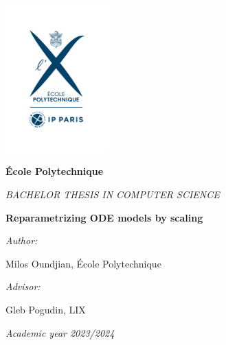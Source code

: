 \documentclass[oneside, a4paper, onecolumn, 11pt]{article}
\newcommand{\thesistitle}[0]{Reparametrizing ODE models by scaling}
\newcommand{\authorname}[0]{Milos Oundjian}
\newcommand{\supervisor}[0]{Gleb Pogudin}
\newcommand{\supervisorinstitution}[0]{LIX}
\begin{document}



\hspace{0pt}
\vfill

\begin{center}

    \includegraphics[width=0.3\textwidth]{logo-EP-vertical}

    \vspace*{2em}
    {\large
        \textbf{\'Ecole Polytechnique}

        \vspace*{1em}
        \textit{BACHELOR THESIS IN COMPUTER SCIENCE}


        \vspace*{3em}
        {\Huge \textbf{\thesistitle}}
        \vspace*{3em}



        \textit{Author:}

        \vspace*{1em}
        \authorname{}, \'Ecole Polytechnique

        \vspace*{2em}
        {\textit{Advisor:}}

        \vspace*{1em}
        \supervisor{}, \supervisorinstitution{}
    }

    \vspace*{2em}
    \textit{Academic year 2023/2024}

\end{center}
\end{document}
